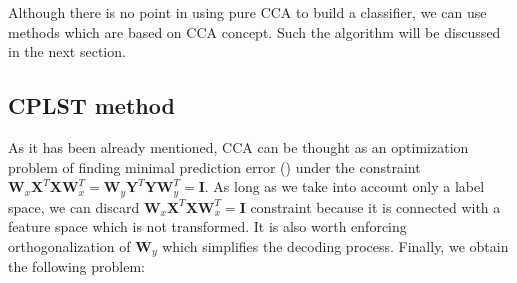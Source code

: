 Although there is no point in using pure CCA to build a classifier, we can use methods which are based on CCA concept. Such the algorithm will be discussed in the next section.

\subsection{CPLST method}

As it has been already mentioned, CCA can be thought as an optimization problem of finding minimal prediction error () under the constraint $\boldsymbol{W}_x\boldsymbol{X}^T\boldsymbol{X}\boldsymbol{W}_x^T=\boldsymbol{W}_y\boldsymbol{Y}^T\boldsymbol{Y}\boldsymbol{W}_y^T=\boldsymbol{I}$. As long as we take into account only a label space, we can discard $\boldsymbol{W}_x\boldsymbol{X}^T\boldsymbol{X}\boldsymbol{W}_x^T=\boldsymbol{I}$ constraint because it is connected with a feature space which is not transformed. It is also worth enforcing orthogonalization of $\boldsymbol{W}_y$  which simplifies the decoding process. Finally, we obtain the following problem:

